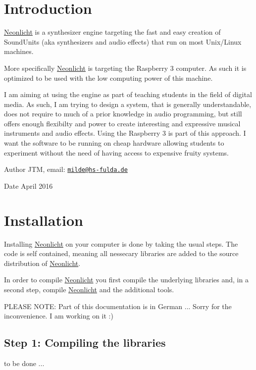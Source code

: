 \hypertarget{index_intro_sec}{}\section{Introduction}\label{index_intro_sec}
\hyperlink{classNeonlicht}{Neonlicht} is a synthesizer engine targeting the fast and easy creation of Sound\-Units (aka synthesizers and audio effects) that run on most Unix/\-Linux machines.

More specifically \hyperlink{classNeonlicht}{Neonlicht} is targeting the Raspberry 3 computer. As such it is optimized to be used with the low computing power of this machine.

I am aiming at using the engine as part of teaching students in the field of digital media. As such, I am trying to design a system, that is generally understandable, does not require to much of a prior knowledge in audio programming, but still offers enough flexibilty and power to create interesting and expressive musical instruments and audio effects. Using the Raspberry 3 is part of this approach. I want the software to be running on cheap hardware allowing students to experiment without the need of having access to expensive fruity systems.

\begin{DoxyAuthor}{Author}
J\-T\-M,  email\-: \href{mailto:milde@hs-fulda.de}{\tt milde@hs-\/fulda.\-de} 
\end{DoxyAuthor}
\begin{DoxyDate}{Date}
April 2016
\end{DoxyDate}
\hypertarget{index_install_sec}{}\section{Installation}\label{index_install_sec}
Installing \hyperlink{classNeonlicht}{Neonlicht} on your computer is done by taking the usual steps. The code is self contained, meaning all nessecary libraries are added to the source distribution of \hyperlink{classNeonlicht}{Neonlicht}.

In order to compile \hyperlink{classNeonlicht}{Neonlicht} you first compile the underlying libraries and, in a second step, compile \hyperlink{classNeonlicht}{Neonlicht} and the additional tools.

P\-L\-E\-A\-S\-E N\-O\-T\-E\-: Part of this documentation is in German ... Sorry for the inconvenience. I am working on it \-:)\hypertarget{index_step1}{}\subsection{Step 1\-: Compiling the libraries}\label{index_step1}
to be done ... 